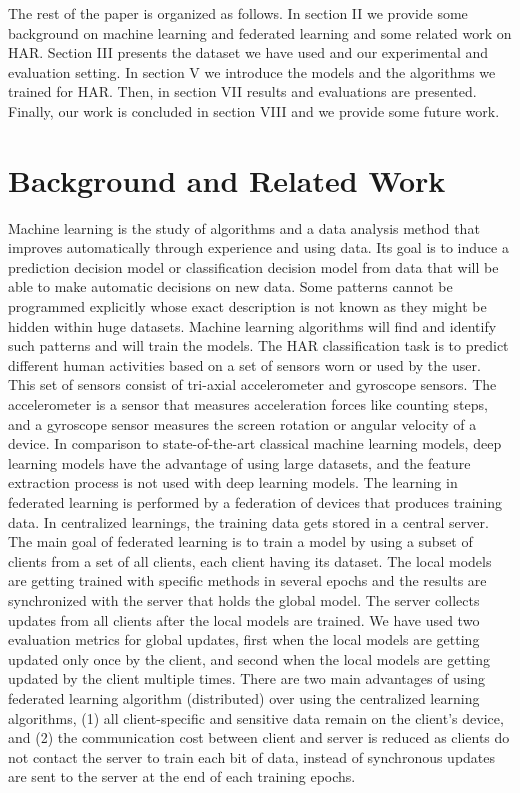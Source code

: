 \documentclass[12pt,conference]{IEEEtran}
\begin{document}
The rest of the paper is organized as follows. In section II we provide some background on machine learning and federated learning and some related work on HAR. Section III presents the dataset we have used and our experimental and evaluation setting. In section V we introduce the models and the algorithms we trained for HAR. Then, in section VII results and evaluations are presented. Finally, our work is concluded in section VIII and we provide some future work.  

\section{
\textbf{Background and Related Work}
}

Machine learning is the study of algorithms and a data analysis method that improves automatically through experience and using data. Its goal is to induce a prediction decision model or classification decision model from data that will be able to make automatic decisions on new data. Some patterns cannot be programmed explicitly whose exact description is not known as they might be hidden within huge datasets. Machine learning algorithms will find and identify such patterns and will train the models. The HAR classification task is to predict different human activities based on a set of sensors worn or used by the user. This set of sensors consist of tri-axial accelerometer and gyroscope sensors. The accelerometer is a sensor that measures acceleration forces like counting steps, and a gyroscope sensor measures the screen rotation or angular velocity of a device.
In comparison to state-of-the-art classical machine learning models, deep learning models have the advantage of using large datasets, and the feature extraction process is not used with deep learning models. The learning in federated learning is performed by a federation of devices that produces training data. In centralized learnings, the training data gets stored in a central server. The main goal of federated learning is to train a model by using a subset of clients from a set of all clients, each client having its dataset. The local models are getting trained with specific methods in several epochs and the results are synchronized with the server that holds the global model. The server collects updates from all clients after the local models are trained. We have used two evaluation metrics for global updates, first when the local models are getting updated only once by the client, and second when the local models are getting updated by the client multiple times. There are two main advantages of using federated learning algorithm (distributed) over using the centralized learning algorithms, (1) all client-specific and sensitive data remain on the client’s device, and (2) the communication cost between client and server is reduced as clients do not contact the server to train each bit of data, instead of synchronous updates are sent to the server at the end of each training epochs.
\end{document}
